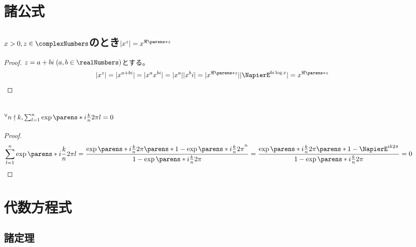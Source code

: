     \section{諸公式}
        \subsection{\texorpdfstring{$x>0,z\in\complexNumbers$}{x>0, zは複素数}のとき\texorpdfstring{$|x^z|=x^{\Re\parens*{z}}$}{x\string^zの絶対値はx\string^Re(z)}}
            \begin{proof}
                $z = a + bi\;(a,b\in\realNumbers)$とする。
                \[ |x^z| = |x^{a+bi}| = |x^a x^{bi}| = |x^a| |x^bi| = |x^{\Re\parens*{z}}| |\NapierE^{bi\log{x}}| = x^{\Re\parens*{z}} \]
            \end{proof}
        \subsection{\texorpdfstring{$^\forall n\nmid k,\sum_{l=1}^n{\exp\parens*{i\frac{k}{n}2\pi l}} = 0$}{kはnの倍数でないとする。exp(ikl2π/n)をl=1,2...,nについて足すと0である。}}
            \label{fml:花びら定理}
            \begin{proof}
                \begin{align*}
                    \sum_{l=1}^n{\exp\parens*{i\frac{k}{n}2\pi l}} &= \frac{\exp\parens*{i\frac{k}{n}2\pi}\parens*{1-\exp\parens*{i\frac{k}{n}2\pi}^n}}{1-\exp\parens*{i\frac{k}{n}2\pi}} = \frac{\exp\parens*{i\frac{k}{n}2\pi}\parens*{1-\NapierE^{ik2\pi}}}{1-\exp\parens*{i\frac{k}{n}2\pi}} =0
                \end{align*}
            \end{proof}
    \section{代数方程式}
        \subsection{諸定理}

